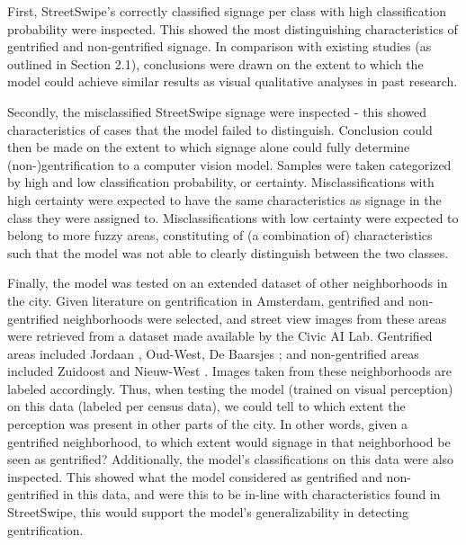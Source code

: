 First, StreetSwipe's correctly classified signage per class with high classification probability were inspected. This showed the most distinguishing characteristics of gentrified and non-gentrified signage. In comparison with existing studies (as outlined in Section 2.1), conclusions were drawn on the extent to which the model could achieve similar results as visual qualitative analyses in past research.

Secondly, the misclassified StreetSwipe signage were inspected - this showed characteristics of cases that the model failed to distinguish. Conclusion could then be made on the extent to which signage alone could fully determine (non-)gentrification to a computer vision model. Samples were taken categorized by high and low classification probability, or certainty. Misclassifications with high certainty were expected to have the same characteristics as signage in the class they were assigned to. Misclassifications with low certainty were expected to belong to more fuzzy areas, constituting of (a combination of) characteristics such that the model was not able to clearly distinguish between the two classes.

Finally, the model was tested on an extended dataset of other neighborhoods in the city. Given literature on gentrification in Amsterdam, gentrified and non-gentrified neighborhoods were selected, and street view images from these areas were retrieved from a dataset made available by the Civic AI Lab. Gentrified areas included Jordaan \cite{verlaan_hippies_2022}, Oud-West, De Baarsjes \cite{rettberg_when_2019}; and non-gentrified areas included Zuidoost and Nieuw-West \cite{pinkster_stickiness_2020}. Images taken from these neighborhoods are labeled accordingly. Thus, when testing the model (trained on visual perception) on this data (labeled per census data), we could tell to which extent the perception was present in other parts of the city. In other words, given a gentrified neighborhood, to which extent would signage in that neighborhood be seen as gentrified? Additionally, the model's classifications on this data were also inspected. This showed what the model considered as gentrified and non-gentrified in this data, and were this to be in-line with characteristics found in StreetSwipe, this would support the model's generalizability in detecting gentrification.

